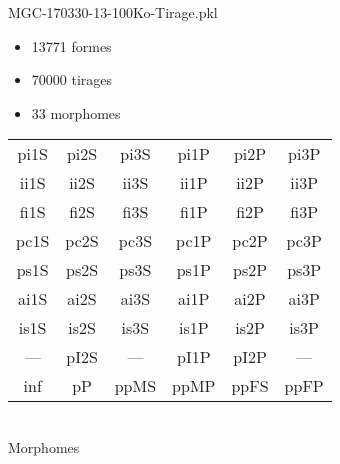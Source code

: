 MGC-170330-13-100Ko-Tirage.pkl
\begin{itemize}
\item 13771 formes
\item 70000 tirages
\item 33 morphomes
\end{itemize}
\begin{center}
\begin{tabular}{cccccc}
\hline
\cellcolor{white}pi1S & \cellcolor{orange}pi2S & \cellcolor{orange}pi3S & \cellcolor{white}pi1P & \cellcolor{white}pi2P & \cellcolor{white}pi3P\\
\cellcolor{brown}ii1S & \cellcolor{brown}ii2S & \cellcolor{brown}ii3S & \cellcolor{white}ii1P & \cellcolor{white}ii2P & \cellcolor{brown}ii3P\\
\cellcolor{yellow}fi1S & \cellcolor{lime}fi2S & \cellcolor{lime}fi3S & \cellcolor{green}fi1P & \cellcolor{white}fi2P & \cellcolor{green}fi3P\\
\cellcolor{yellow}pc1S & \cellcolor{yellow}pc2S & \cellcolor{yellow}pc3S & \cellcolor{white}pc1P & \cellcolor{white}pc2P & \cellcolor{yellow}pc3P\\
\cellcolor{teal}ps1S & \cellcolor{teal}ps2S & \cellcolor{teal}ps3S & \cellcolor{white}ps1P & \cellcolor{white}ps2P & \cellcolor{teal}ps3P\\
\cellcolor{white}ai1S & \cellcolor{lightgray}ai2S & \cellcolor{lightgray}ai3S & \cellcolor{white}ai1P & \cellcolor{blue}ai2P & \cellcolor{white}ai3P\\
\cellcolor{pink}is1S & \cellcolor{white}is2S & \cellcolor{lightgray}is3S & \cellcolor{white}is1P & \cellcolor{black}is2P & \cellcolor{pink}is3P\\
--- & \cellcolor{white}pI2S & --- & \cellcolor{white}pI1P & \cellcolor{blue}pI2P & ---\\
\cellcolor{white}inf & \cellcolor{white}pP & \cellcolor{white}ppMS & \cellcolor{white}ppMP & \cellcolor{white}ppFS & \cellcolor{white}ppFP\\
\hline
\end{tabular}\\
Morphomes
\end{center}
\bigskip

